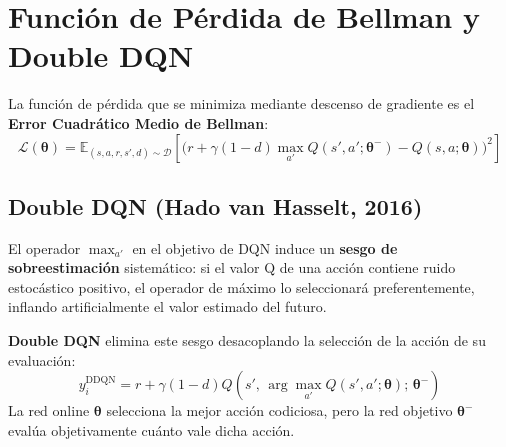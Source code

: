 \section{Función de Pérdida de Bellman y Double DQN}
La función de pérdida que se minimiza mediante descenso de gradiente es el \textbf{Error Cuadrático Medio de Bellman}:
\begin{equation}
  \mathcal{L}(\boldsymbol{\theta}) = \mathbb{E}_{(s, a, r, s', d) \sim \mathcal{D}} \left[ \Big( r + \gamma (1 - d) \max_{a'} Q(s', a'; \boldsymbol{\theta}^-) - Q(s, a; \boldsymbol{\theta}) \Big)^2 \right]
\end{equation}

\subsection{Double DQN (Hado van Hasselt, 2016)}
El operador $\max_{a'}$ en el objetivo de DQN induce un \textbf{sesgo de sobreestimación} sistemático: si el valor Q de una acción contiene ruido estocástico positivo, el operador de máximo lo seleccionará preferentemente, inflando artificialmente el valor estimado del futuro.

\textbf{Double DQN} elimina este sesgo desacoplando la selección de la acción de su evaluación:
\begin{equation}
  y_i^{\text{DDQN}} = r + \gamma (1 - d) Q\left( s', \, \arg\max_{a'} Q(s', a'; \boldsymbol{\theta}); \, \boldsymbol{\theta}^- \right)
\end{equation}
La red online $\boldsymbol{\theta}$ selecciona la mejor acción codiciosa, pero la red objetivo $\boldsymbol{\theta}^-$ evalúa objetivamente cuánto vale dicha acción.

